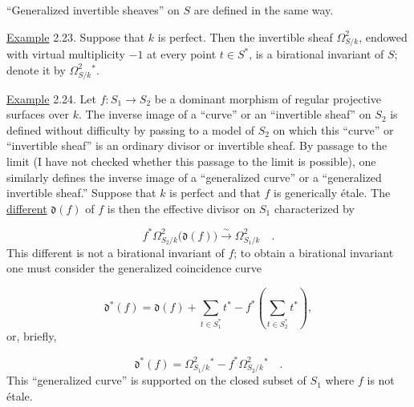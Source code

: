 ``Generalized invertible sheaves'' on $S$ are defined in the same way.


\underline{Example} 2.23. Suppose that $k$ is perfect.  Then the invertible
sheaf $\Omega^2_{S/k}$, endowed with virtual multiplicity $-1$ at every point
$t\in S^*$, is a birational invariant of $S$; denote it by
$\Omega^2_{S/k}{}^*$.

\underline{Example} 2.24. Let $f:S_1\longrightarrow S_2$ be a dominant
morphism of regular projective surfaces over $k$.  The inverse image of a
``curve'' or an ``invertible sheaf'' on $S_2$ is defined without difficulty by
passing to a model of $S_2$ on which this ``curve'' or ``invertible sheaf'' is
an ordinary divisor or invertible sheaf.  By passage to the limit (I have not
checked whether this passage to the limit is possible), one similarly defines
the inverse image of a ``generalized curve'' or a ``generalized invertible
sheaf.''  Suppose that $k$ is perfect and that $f$ is generically \'{e}tale.
The \underline{different} $\mathfrak d(f)$ of $f$ is then the effective divisor
on $S_1$ characterized by

\begin{equation*}
f^*\Omega^2_{S_2/k}\bigl(\mathfrak d(f)\bigr)
\overset{\sim}{\longrightarrow}\Omega^2_{S_1/k} \quad .
\end{equation*}
This different is not a birational invariant of $f$; to obtain a birational
invariant one must consider the generalized coincidence curve

\begin{equation*}
\mathfrak d^*(f)=\mathfrak d(f)+\sum_{t\in S_1^*}t^*
-f^*\left(\sum_{t\in S_2^*}t^*\right),
\end{equation*}
or, briefly,

\begin{equation*}
\mathfrak d^*(f)=\Omega^2_{S_1/k}{}^*
-f^*\Omega^2_{S_2/k}{}^* \quad .
\end{equation*}
This ``generalized curve'' is supported on the closed subset of $S_1$ where
$f$ is not \'{e}tale.

